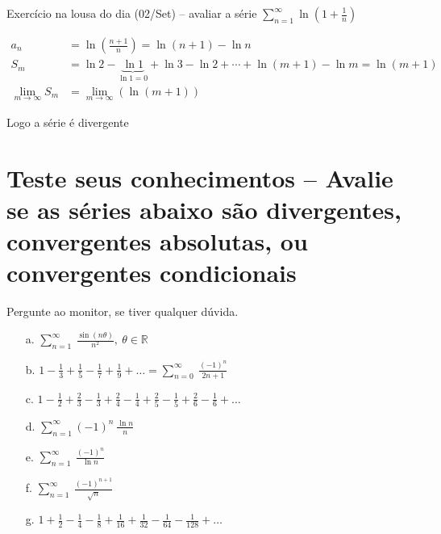 \documentclass[12pt,openany]{book}
\newcommand{\LI}[1][n]{\lim_{{#1} \rightarrow \infty}}
\newcommand{\soma}[2][n]{\sum_{{#1} = #2}^\infty}
\begin{document}
Exercício na lousa do dia (02/Set) -- avaliar a série $\soma{1} \ln \left( 1 + \frac{1}{n}\right)$

\begin{align*}
a_n &= \ln \left( \frac{n+1}{n} \right) = \ln (n+1) - \ln n \\
S_m &= \ln 2 - \underbrace{\ln 1}_{\ln 1 = 0} + \ln 3 - \ln 2 + \cdots + \ln (m+1) - \ln m = \ln (m+1)\\
\LI[m] S_m &= \LI[m] (\ln (m+1))
\end{align*}

Logo a série é divergente

\section{Teste seus conhecimentos -- Avalie se as séries abaixo são divergentes, convergentes absolutas, ou convergentes condicionais} Pergunte ao monitor, se tiver qualquer dúvida.
\begin{itemize}
\item [a.] $\displaystyle{\sum_{n=1}^{\infty} \ \frac{\sin(n\theta)}{n^2}, \ \theta \in \mathds{R}}$
\item [b.] $\displaystyle{1-\frac{1}{3}+\frac{1}{5}-\frac{1}{7}+ \frac{1}{9} + \hdots = \sum_{n=0}^{\infty} \ \frac{(-1)^n}{2n+1}}$
\item [c.] $\displaystyle{1-\frac{1}{2}+\frac{2}{3}-\frac{1}{3}+\frac{2}{4}-\frac{1}{4}+\frac{2}{5}-\frac{1}{5}+\frac{2}{6}}-\frac{1}{6}+ \hdots$
\item [d.] $\displaystyle{\sum_{n=1}^{\infty} (-1)^n \ \frac{\ln n}{n}}$
\item [e.] $\displaystyle{\sum_{n=1}^{\infty} \ \frac{(-1)^n}{\ln n}}$
\item [f.] $\displaystyle{\sum_{n=1}^{\infty} \ \frac{(-1)^{n+1}}{\sqrt{n}}}$
\item [g.] $\displaystyle{1+\frac{1}{2}-\frac{1}{4}-\frac{1}{8}+\frac{1}{16}+\frac{1}{32}-\frac{1}{64}-\frac{1}{128}+\hdots}$
\end{itemize}
\end{document}
